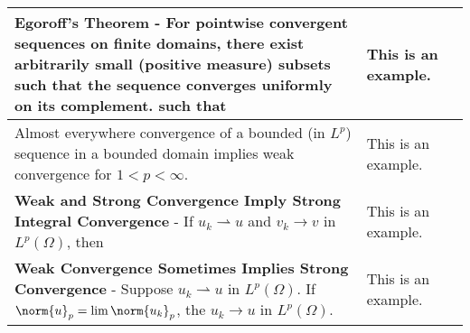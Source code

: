 \begin{longtable}{|*{3}{>{\centering\arraybackslash}p{}|}}
            \textbf{Egoroff's Theorem} - For pointwise convergent sequences on finite domains, there exist arbitrarily small (positive measure) subsets such that the sequence converges uniformly on its complement. \newline {$\!\begin{gathered}\forall \E < 0,\ \exists E \subset \Omega\ \text{with}\ \abs{E} < \E\end{gathered}$} \newline such that \newline {$\!\begin{gathered} f_k \rightarrow f\ \text{uniformly on}\ \Omega\setminus E \end{gathered}$} & This is an example. \\[6pt] \hline
            
            Almost everywhere convergence of a bounded (in $L^p$) sequence in a bounded domain implies weak convergence for $1 < p < \infty$. \newline {$\!\begin{gathered}\left\{\begin{array}{l} \Omega \subset \Rl^n\ \text{bounded}, \\ \sup_{k}\norm{f_k}_p \leq M < \infty, \text{and} \\ f_k \rightarrow f\ \text{ a.e.} \end{array}\right\} \implies f_k \rightharpoonup f \end{gathered}$} & This is an example. \\[6pt] \hline
            
            \textbf{Weak and Strong Convergence Imply Strong Integral Convergence} - If $u_k \rightharpoonup u$ and $v_k \rightarrow v$ in $L^p(\Omega)$, then \newline {$\!\begin{gathered}\int_\Omega u_kv_k \dd x \rightarrow \int_\Omega uv \dd x \end{gathered}$} & This is an example. \\[6pt] \hline
            
            \textbf{Weak Convergence Sometimes Implies Strong Convergence} - Suppose $u_k \rightharpoonup u$ in $L^p(\Omega)$.  If $\norm{u}_p = \lim\norm{u_k}_p$, the $u_k \rightarrow u$ in $L^p(\Omega)$. & This is an example. \\[6pt] \hline
            
    \bottomrule
\end{longtable}